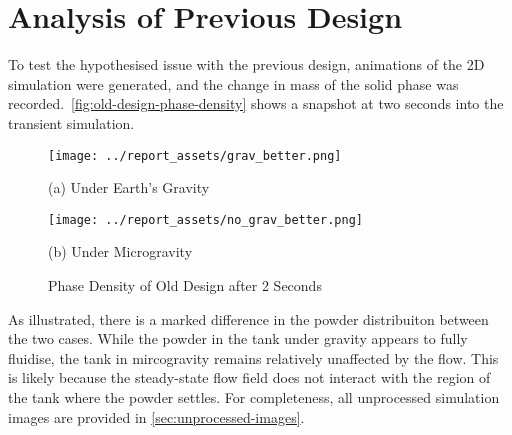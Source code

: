 \section{Analysis of Previous Design}\label{sec:prev-design-analysis}
To test the hypothesised issue with the previous design, animations of the 2D simulation were generated, and the change in mass of the solid phase was recorded.~\autoref{fig:old-design-phase-density} shows a snapshot at two seconds into the transient simulation. 
\begin{figure}[htbp]
    \centering
    
    \begin{minipage}{0.4\textwidth}
        \centering
        \texttt{[image: ../report\_assets/grav\_better.png]}
        \caption*{(a) Under Earth's Gravity}
    \end{minipage}
    \hfill
    \begin{minipage}{0.4\textwidth}
        \centering
        \texttt{[image: ../report\_assets/no\_grav\_better.png]}
        \caption*{(b) Under Microgravity}
    \end{minipage}
    \caption{Phase Density of Old Design after 2 Seconds}\label{fig:old-design-phase-density}
\end{figure}
As illustrated, there is a marked difference in the powder distribuiton between the two cases. While the powder in the tank under gravity appears to fully fluidise, the tank in mircogravity remains relatively unaffected by the flow. This is likely because the steady-state flow field does not interact with the region of the tank where the powder settles. For completeness, all unprocessed simulation images are provided in \autoref{sec:unprocessed-images}.

